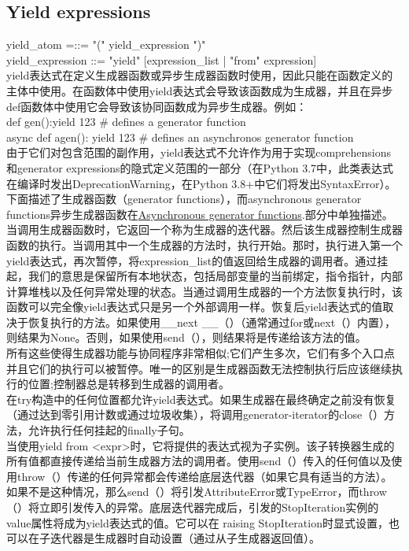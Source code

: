 \documentclass[10pt,UTF8]{ctexart}
\begin{document}
\subsection{Yield expressions}
yield_atom =::= "(" yield_expression ")"\\
yield_expression ::=  "yield" [expression_list | "from" expression]\\
\indent yield表达式在定义生成器函数或异步生成器函数时使用，因此只能在函数定义的主体中使用。在函数体中使用yield表达式会导致该函数成为生成器，并且在异步def函数体中使用它会导致该协同函数成为异步生成器。例如：\\
def gen():yield 123  \# defines a generator function\\
async def agen(): yield 123 \# defines an asynchronos generator function\\
\indent 由于它们对包含范围的副作用，yield表达式不允许作为用于实现comprehensions 和generator expressions的隐式定义范围的一部分（在Python 3.7中，此类表达式在编译时发出DeprecationWarning，在Python 3.8+中它们将发出SyntaxError）。\\
\indent 下面描述了生成器函数（generator functions），而asynchronous generator functions异步生成器函数在\href{https://docs.python.org/3/reference/expressions.html#asynchronous-generator-functions}{Asynchronous generator functions}.部分中单独描述。\\
\indent 当调用生成器函数时，它返回一个称为生成器的迭代器。然后该生成器控制生成器函数的执行。当调用其中一个生成器的方法时，执行开始。那时，执行进入第一个yield表达式，再次暂停，将expression_list的值返回给生成器的调用者。通过挂起，我们的意思是保留所有本地状态，包括局部变量的当前绑定，指令指针，内部计算堆栈以及任何异常处理的状态。当通过调用生成器的一个方法恢复执行时，该函数可以完全像yield表达式只是另一个外部调用一样。恢复后yield表达式的值取决于恢复执行的方法。如果使用__next __（）（通常通过for或next（）内置），则结果为None。否则，如果使用send（），则结果将是传递给该方法的值。\\
\indent 所有这些使得生成器功能与协同程序非常相似;它们产生多次，它们有多个入口点并且它们的执行可以被暂停。唯一的区别是生成器函数无法控制执行后应该继续执行的位置;控制器总是转移到生成器的调用者。\\
\indent 在try构造中的任何位置都允许yield表达式。如果生成器在最终确定之前没有恢复（通过达到零引用计数或通过垃圾收集），将调用generator-iterator的close（）方法，允许执行任何挂起的finally子句。\\
\indent 当使用yield from <expr>时，它将提供的表达式视为子实例。该子转换器生成的所有值都直接传递给当前生成器方法的调用者。使用send（）传入的任何值以及使用throw（）传递的任何异常都会传递给底层迭代器（如果它具有适当的方法）。如果不是这种情况，那么send（）将引发AttributeError或TypeError，而throw（）将立即引发传入的异常。底层迭代器完成后，引发的StopIteration实例的value属性将成为yield表达式的值。它可以在 raising StopIteration时显式设置，也可以在子迭代器是生成器时自动设置（通过从子生成器返回值）。\\
\end{document}
